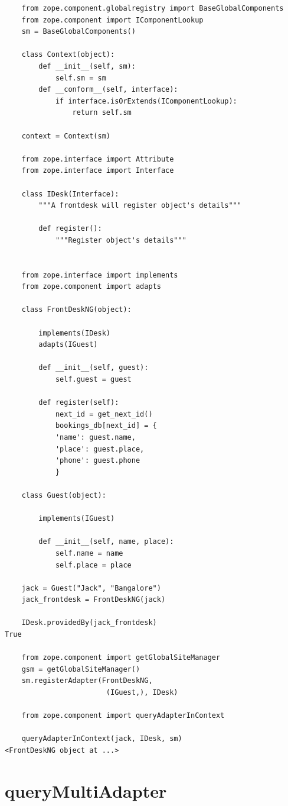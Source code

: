 \documentclass[a4paper,openany,twoside,final]{book}
\begin{document}
\begin{verbatim}
    from zope.component.globalregistry import BaseGlobalComponents
    from zope.component import IComponentLookup
    sm = BaseGlobalComponents()

    class Context(object):
        def __init__(self, sm):
            self.sm = sm
        def __conform__(self, interface):
            if interface.isOrExtends(IComponentLookup):
                return self.sm

    context = Context(sm)

    from zope.interface import Attribute
    from zope.interface import Interface

    class IDesk(Interface):
        """A frontdesk will register object's details"""

        def register():
            """Register object's details"""


    from zope.interface import implements
    from zope.component import adapts

    class FrontDeskNG(object):

        implements(IDesk)
        adapts(IGuest)

        def __init__(self, guest):
            self.guest = guest

        def register(self):
            next_id = get_next_id()
            bookings_db[next_id] = {
            'name': guest.name,
            'place': guest.place,
            'phone': guest.phone
            }

    class Guest(object):

        implements(IGuest)

        def __init__(self, name, place):
            self.name = name
            self.place = place

    jack = Guest("Jack", "Bangalore")
    jack_frontdesk = FrontDeskNG(jack)

    IDesk.providedBy(jack_frontdesk)
True

    from zope.component import getGlobalSiteManager
    gsm = getGlobalSiteManager()
    sm.registerAdapter(FrontDeskNG,
                        (IGuest,), IDesk)

    from zope.component import queryAdapterInContext

    queryAdapterInContext(jack, IDesk, sm)
<FrontDeskNG object at ...>
\end{verbatim}


\section*{queryMultiAdapter%
  \label{querymultiadapter}%
}
\end{document}

